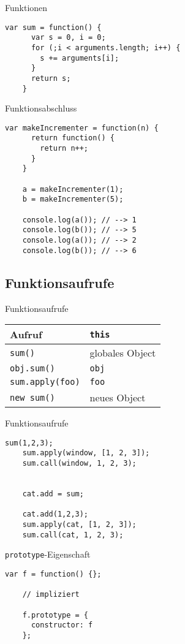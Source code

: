 \begin{frame}[fragile]{Funktionen}
  \begin{lstlisting}[gobble=4]
    var sum = function() {
      var s = 0, i = 0;
      for (;i < arguments.length; i++) {
        s += arguments[i];
      }
      return s;
    }
  \end{lstlisting}
\end{frame}

\begin{frame}[fragile]{Funktionsabschluss}
  \begin{lstlisting}[gobble=4]
    var makeIncrementer = function(n) {
      return function() {
        return n++;
      }
    }
    
    a = makeIncrementer(1);
    b = makeIncrementer(5);
    
    console.log(a()); // --> 1
    console.log(b()); // --> 5
    console.log(a()); // --> 2
    console.log(b()); // --> 6
  \end{lstlisting}
\end{frame}

\subsection{Funktionsaufrufe}

\begin{frame}{Funktionsaufrufe}
  \begin{tabular}{ll}
    Aufruf & \lstinline-this- \\ \hline
    \lstinline-sum()- & globales Object \\
    \lstinline-obj.sum()- & \lstinline-obj- \\
    \lstinline-sum.apply(foo)- & \lstinline-foo- \\
    \lstinline-new sum()- & neues Object
  \end{tabular}
\end{frame}

\begin{frame}[fragile]{Funktionsaufrufe}
  \begin{lstlisting}[gobble=4]
    sum(1,2,3);
    sum.apply(window, [1, 2, 3]);
    sum.call(window, 1, 2, 3);
    
    
    cat.add = sum;
    
    cat.add(1,2,3);
    sum.apply(cat, [1, 2, 3]);
    sum.call(cat, 1, 2, 3);
  \end{lstlisting}
\end{frame}

\begin{frame}[fragile]{\lstinline-prototype--Eigenschaft}
  \begin{lstlisting}[gobble=4]
    var f = function() {};
    
    // impliziert
    
    f.prototype = {
      constructor: f
    };
  \end{lstlisting}
\end{frame}

